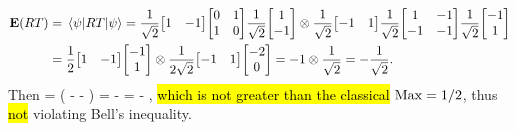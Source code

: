 \begin{solution}
\begin{align*}
		\vE(RT) &= \ev{R T}{\psi}
		= \frac{1}{\sqrt{2}} \mqty[ 1 & -1 ] \mqty[ 0 & 1 \\ 1 & 0 ] \frac{1}{\sqrt{2}} \mqty[ 1 \\ -1 ] \otimes \frac{1}{\sqrt{2}} \mqty[ -1 & 1 ] \frac{1}{\sqrt{2}} \mqty[ 1 & -1 \\ -1 & -1 ] \frac{1}{\sqrt{2}} \mqty[ -1 \\ 1 ] \\
		&= \frac{1}{2} \mqty[ 1 & -1 ] \mqty[ -1 \\ 1 ] \otimes \frac{1}{2 \sqrt{2}} \mqty[ -1 & 1 ] \mqty[ -2 \\ 0 ]
		= -1 \otimes \frac{1}{\sqrt{2}}
		= -\frac{1}{\sqrt{2}}.
	\end{align*}
	Then
	\beq
		 =  \left( - -  \right)
		= -
		= - ,
	\eeq
	\hl{which is not greater than the classical} $\text{Max} = 1/2$, thus \hl{not} violating Bell's inequality.
\end{solution}